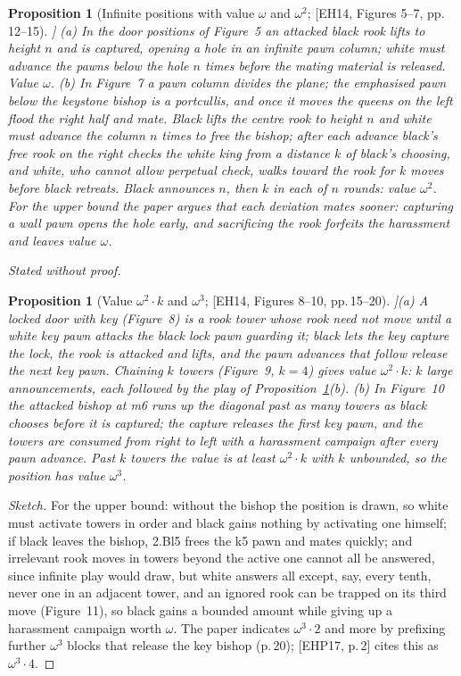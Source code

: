 \documentclass[10pt]{article}
\theoremstyle{notes}
\newtheorem{proposition}[theorem]{Proposition}
\newenvironment{sketch}{\begin{proof}[Sketch]\renewcommand{\qedsymbol}{}}{\end{proof}}
\newcommand{\stated}{\par\noindent\emph{Stated without proof.}\par}
\newcommand{\EH}[1]{[EH14, #1]}
\newcommand{\EHP}[1]{[EHP17, #1]}
\begin{document}
\begin{proposition}[Infinite positions with value $\omega$ and $\omega^2$; \EH{Figures 5--7, pp.\,12--15}]
\label{prop:omega2}
(a) In the door positions of Figure~5 an attacked black rook lifts to height $n$ and is captured, opening a
hole in an infinite pawn column; white must advance the pawns below the hole $n$ times before the mating
material is released. Value $\omega$.
(b) In Figure~7 a pawn column divides the plane; the emphasised pawn below the keystone bishop is a
portcullis, and once it moves the queens on the left flood the right half and mate. Black lifts the centre
rook to height $n$ and white must advance the column $n$ times to free the bishop; after each advance black's
free rook on the right checks the white king from a distance $k$ of black's choosing, and white, who cannot
allow perpetual check, walks toward the rook for $k$ moves before black retreats. Black announces $n$, then
$k$ in each of $n$ rounds: value $\omega^2$. For the upper bound the paper argues that each deviation mates
sooner: capturing a wall pawn opens the hole early, and sacrificing the rook forfeits the harassment and
leaves value $\omega$.
\stated
\end{proposition}

\begin{proposition}[Value $\omega^2\cdot k$ and $\omega^3$; \EH{Figures 8--10, pp.\,15--20}]\label{prop:omega3}
(a) A \emph{locked door with key} (Figure~8) is a rook tower whose rook need not move until a white
\emph{key} pawn attacks the black \emph{lock} pawn guarding it; black lets the key capture the lock, the rook
is attacked and lifts, and the pawn advances that follow release the next key pawn. Chaining $k$ towers
(Figure~9, $k=4$) gives value $\omega^2\cdot k$: $k$ large announcements, each followed by the play of
Proposition~\ref{prop:omega2}(b).
(b) In Figure~10 the attacked bishop at m6 runs up the diagonal past as many towers as black chooses before
it is captured; the capture releases the first key pawn, and the towers are consumed from right to left with
a harassment campaign after every pawn advance. Past $k$ towers the value is at least $\omega^2\cdot k$ with
$k$ unbounded, so the position has value $\omega^3$.
\end{proposition}

\begin{sketch}
For the upper bound: without the bishop the position is drawn, so white must activate towers in order and
black gains nothing by activating one himself; if black leaves the bishop, 2.Bl5 frees the k5 pawn and mates
quickly; and irrelevant rook moves in towers beyond the active one cannot all be answered, since infinite play
would draw, but white answers all except, say, every tenth, never one in an adjacent tower, and an ignored
rook can be trapped on its third move (Figure~11), so black gains a bounded amount while giving up a
harassment campaign worth $\omega$. The paper indicates $\omega^3\cdot 2$ and more by prefixing further $\omega^3$
blocks that release the key bishop (p.\,20); \EHP{p.\,2} cites this as $\omega^3\cdot 4$.
\end{sketch}
\end{document}
